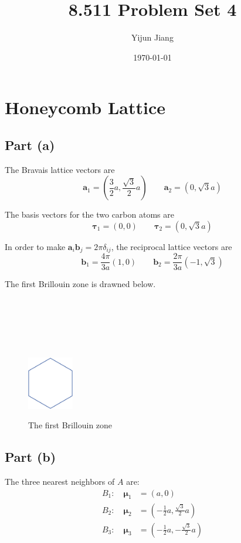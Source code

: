 \documentclass{article}
\title{8.511 Problem Set 4}
\author{Yijun Jiang}
\date{\today}
\begin{document}
\maketitle
\section{Honeycomb Lattice}
\subsection{Part (a)}
The Bravais lattice vectors are
\begin{equation*}
	\mathbf{a}_1=\left(\frac{3}{2}a,\frac{\sqrt{3}}{2}a\right)\quad\quad\mathbf{a}_2=\left(0,\sqrt{3}a\right)
\end{equation*}

The basis vectors for the two carbon atoms are
\begin{equation*}
	\bm{\tau}_1=(0,0)\quad\quad\bm{\tau}_2=\left(0,\sqrt{3}a\right)
\end{equation*}

In order to make $\mathbf{a}_i\mathbf{b}_j=2\pi\delta_{ij}$, the reciprocal lattice vectors are
\begin{equation*}
	\mathbf{b}_1=\frac{4\pi}{3a}(1,0)\quad\quad\mathbf{b}_2=\frac{2\pi}{3a}\left(-1,\sqrt{3}\right)
\end{equation*}

The first Brillouin zone is drawned below.

~

~

~

\begin{figure}[!htbp]
	\centering
	\includegraphics[width=2cm]{hex.png}\\
	\caption{The first Brillouin zone}
\end{figure}

\subsection{Part (b)}
The three nearest neighbors of $A$ are:
\begin{align*}
	B_1:\quad\bm{\mu}_1&=(a,0)\\
	B_2:\quad\bm{\mu}_2&=\left(-\frac{1}{2}a,\frac{\sqrt{3}}{2}a\right)\\
	B_3:\quad\bm{\mu}_3&=\left(-\frac{1}{2}a,-\frac{\sqrt{3}}{2}a\right)
\end{align*}
\end{document}
